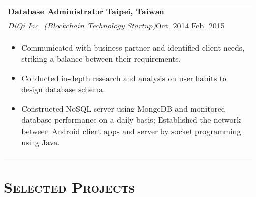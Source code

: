 \documentclass[a4paper,11pt]{article} %
\begin{document}
{\begin{tabular}{p{18.5cm}}
%
{\large\bf{Database Administrator}} \hfill \bf{Taipei, Taiwan}\\ 
{\it DiQi Inc. (Blockchain Technology Startup)}\hfill  Oct. 2014-Feb. 2015  \\%
\begin{itemize}
\vspace{-3mm}
\item Communicated with business partner and identified client needs, striking a balance between their requirements. 
\item Conducted in-depth research and analysis on user habits to design database schema.
\item Constructed NoSQL server using MongoDB and monitored database performance on a daily basis; Established the network between Android client apps and server by socket programming using Java. \vspace*{-\baselineskip}
\end{itemize}\\
\end{tabular}


\section{\Large\bf\textsc{Selected Projects}}
\begin{tabular}{p{18.5cm}}


\end{tabular}}
\end{document}
